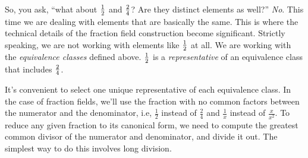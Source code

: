 So, you ask, ``what about $1\over2$ and $2\over4$?  Are they distinct
elements as well?''  {\it No}.  This time we are dealing with elements
that are basically the same. This is where the technical details of
the fraction field construction become significant.  Strictly
speaking, we are not working with elements like $1\over2$ at all.  We
are working with the {\it equivalence classes} defined above.
$1\over2$ is a {\it representative} of an equivalence class that
includes $2\over4$.

It's convenient to select one unique representative of each
equivalence class.  In the case of fraction fields, we'll use the
fraction with no common factors between the numerator and the
denominator, i.e, $\frac{1}{2}$ instead of $\frac{2}{4}$ and
$\frac{1}{x}$ instead of $\frac{x}{x^2}$.  To reduce any given
fraction to its canonical form, we need to compute the greatest common
divisor of the numerator and denominator, and divide it out.
The simplest way to do this involves long division.

\begin{comment}

If all this seems a bit arbitrary, well, it is.  I could easily pick
two numbers from {\bf Z} and pair them into equivalence classes in
some other way than for {\bf Q}; if my basic axioms were satisified I
would even have a field!  Whether it would be useful for something
other than puzzling the few readers who would bother is a different
story.  Let me briefly cite a few other examples of {\it useful}
equivalence classes.  Take pairs of elements from a field $f$ and $g$
in the expression $f\,dg$ and form equivalence classes based on
whether the expression can be transformed to $f'\,dg'$; this is one
way to introduce differentials into an algebraic context.  Take points
in a Cartesian geometry $(x_1, x_2,\ldots x_n)$ and group them
together if they are related by a simple constant multiple $(\lambda
x_1, \lambda x_2,\ldots \lambda x_n)$; you now have lines through the
origin and the basis for projective geometry.  Take infinite
convergent sequences of rational numbers (from {\bf Q}) and group them
together if the differences between them converge to zero; the
equivalence classes are the real numbers.  I could keep going.  These
constructions are easy to form; their utility lies in our ability to
relate them to real world problems.

\end{comment}

\vfill\eject

